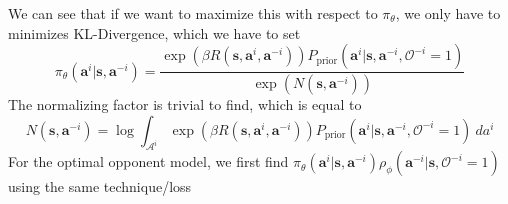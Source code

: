 We can see that if we want to maximize this with respect to $\pi_{\theta}$, we only have to minimizes KL-Divergence, which we have to set 
\begin{equation}
    \pi_{\theta}(\boldsymbol{a}^i | \boldsymbol{s}, \boldsymbol{a}^{-i}) = \frac{\exp (\beta R(\boldsymbol{s}, \boldsymbol{a}^i, \boldsymbol{a}^{-i})) P_{\text{prior}}(\boldsymbol{a}^i | \boldsymbol{s}, \boldsymbol{a}^{-i}, \mathcal{O}^{-i} = 1)}{\exp( N(\boldsymbol{s}, \boldsymbol{a}^{-i}))}
\end{equation}
The normalizing factor is trivial to find, which is equal to 
\begin{equation}
    N(\boldsymbol{s}, \boldsymbol{a}^{-i}) = \log \int_{\mathcal{A}^i} \exp (\beta R(\boldsymbol{s}, \boldsymbol{a}^i, \boldsymbol{a}^{-i})) P_{\text{prior}}(\boldsymbol{a}^i | \boldsymbol{s}, \boldsymbol{a}^{-i}, \mathcal{O}^{-i} = 1) \ da^{i}
\end{equation}
For the optimal opponent model, we first find  $\pi_{\theta}(\boldsymbol{a}^i | \boldsymbol{s}, \boldsymbol{a}^{-i}) \rho_{\phi}(\boldsymbol{a}^{-i} | \boldsymbol{s}, \mathcal{O}^{-i} = 1)$ using the same technique/loss 


